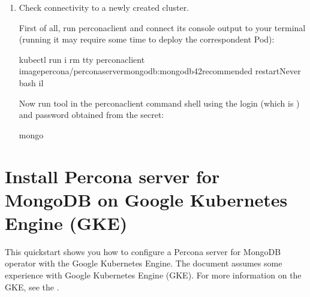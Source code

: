 \documentclass[letterpaper,10pt,english]{sphinxmanual}
\begin{document}
\begin{enumerate}
\begin{sphinxVerbatim}[commandchars=\\\{\}]
   
   
\end{sphinxVerbatim}

Here the actual login name and password are base64\sphinxhyphen{}encoded, and
 will bring it back to a
human\sphinxhyphen{}readable form.

\item {} 
Check connectivity to a newly created cluster.

First of all, run percona\sphinxhyphen{}client and connect its console output to your
terminal (running it may require some time to deploy the correspondent Pod):

\begin{sphinxVerbatim}[commandchars=\\\{\}]
kubectl run \PYGZhy{}i \PYGZhy{}\PYGZhy{}rm \PYGZhy{}\PYGZhy{}tty percona\PYGZhy{}client \PYGZhy{}\PYGZhy{}imagepercona/percona\PYGZhy{}server\PYGZhy{}mongodb:mongodb42recommended \PYGZhy{}\PYGZhy{}restartNever \PYGZhy{}\PYGZhy{} bash \PYGZhy{}il
\end{sphinxVerbatim}

Now run  tool in the percona\sphinxhyphen{}client command shell using the login
(which is ) and password obtained from the secret:

\begin{sphinxVerbatim}[commandchars=\\\{\}]
mongo 
\end{sphinxVerbatim}

\end{enumerate}


\chapter{Install Percona server for MongoDB on Google Kubernetes Engine (GKE)}
\label{\detokenize{gke:install-percona-server-for-mongodb-on-google-kubernetes-engine-gke}}\label{\detokenize{gke::doc}}
This quickstart shows you how to configure a Percona server for MongoDB operator with the Google Kubernetes Engine. The document assumes some experience with Google Kubernetes Engine (GKE). For more information on the GKE, see the .
\end{document}
